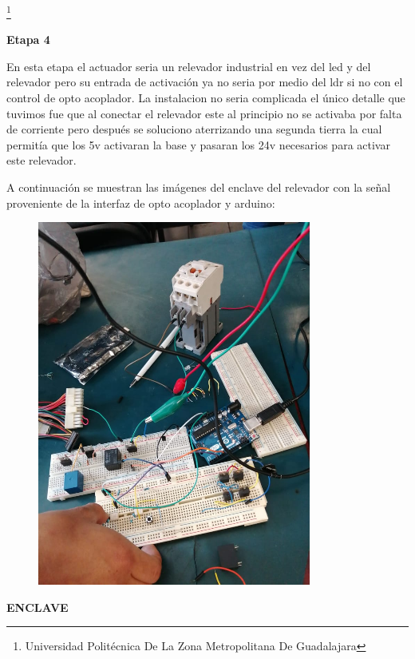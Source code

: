 \documentclass[11pt,a4paper]{article}
\begin{document}
\footnote{Universidad Politécnica De La Zona Metropolitana De Guadalajara} 

\newpage

\textbf{Etapa 4}

En esta etapa el actuador seria un relevador industrial en vez del led y del relevador pero su entrada de activación ya no seria por medio del ldr si no con el control de opto acoplador. La instalacion no seria complicada el único detalle que tuvimos fue que al conectar el relevador este al principio no se activaba por falta de corriente pero después se soluciono aterrizando una segunda tierra la cual permitía que los 5v activaran la base y pasaran los 24v necesarios para activar este relevador.

A continuación se muestran las imágenes del enclave del relevador con la señal proveniente de la interfaz de opto acoplador y arduino:

\begin{figure}[hbtp]
\centering
\includegraphics[scale=0.50]{8.png}
\end{figure}

\textbf{ENCLAVE}
\end{document}

